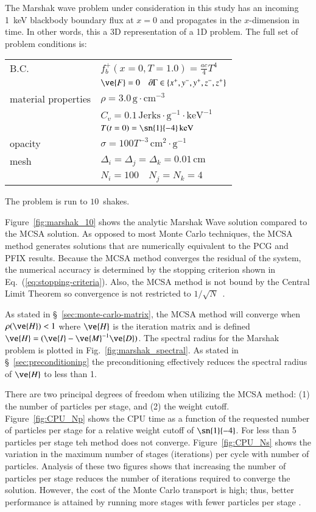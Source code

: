 \documentclass[preprint,12pt]{elsarticle}
\newcommand{\vI}{\ensuremath{\ve{I}}}
\newcommand{\Cv}{\ensuremath{C_{v}}}
\newcommand{\Di}{\ensuremath{\Delta_i}}
\newcommand{\Dj}{\ensuremath{\Delta_j}}
\newcommand{\Dk}{\ensuremath{\Delta_k}}
\begin{document}
The Marshak wave problem under consideration in this study has an
incoming 1~keV blackbody boundary flux at $x=0$ and propagates
in the $x$-dimension in time.  In other words, this a 3D
representation of a 1D problem.  The full set of problem conditions
is:
\begin{center}
  \begin{tabular}{ll}\hline
    B.C. & $f_b^{+}(x=0,T=1.0) = \frac{ac}{4}T^4$ \\
    & $\ve{F} = 0\quad \partial\Gamma \in \{x^{+}, y^{-}, y^{+},
    z^{-}, z^{+}\}$ \\
    material properties & $\rho = 3.0\,\text{g}\cdot\text{cm}^{-3}$ \\
    & $\Cv = 0.1\,\text{Jerks}\cdot\text{g}^{-1}\cdot\text{keV}^{-1}$\\
    & $T(t=0) = \sn{1}{-4}\,\text{keV}$\\
    opacity & $\sigma = 100T^{-3}\,\text{cm}^2\cdot\text{g}^{-1}$ \\
    mesh & $\Di = \Dj = \Dk = 0.01\,\text{cm}$ \\
    & $N_i = 100\quad N_j = N_k = 4$ \\
    \hline
  \end{tabular}
\end{center}
The problem is run to $10$~shakes.

Figure~\ref{fig:marshak_10} shows the analytic Marshak Wave solution
compared to the MCSA solution.  As opposed to most Monte Carlo
techniques, the MCSA method generates solutions that are numerically
equivalent to the PCG and PFIX results.  Because the MCSA method
converges the residual of the system, the numerical accuracy is
determined by the stopping criterion shown in
Eq.~(\ref{eq:stopping-criteria}).  Also, the MCSA method is not bound
by the Central Limit Theorem so convergence is not restricted to
$1/\sqrt{N}$~\cite{halton_1994,evans_2003}.

As stated in \S~\ref{sec:monte-carlo-matrix}, the MCSA method will
converge when $\rho(\ve{H})< 1$ where $\ve{H}$ is the iteration matrix
and is defined $\ve{H} = (\vI - \ve{M}^{-1}\ve{D})$.  The spectral
radius for the Marshak problem is plotted in
Fig.~\ref{fig:marshak_spectral}.  As stated in
\S~\ref{sec:preconditioning} the preconditioning effectively reduces
the spectral radius of $\ve{H}$ to less than 1.

There are two principal degrees of freedom when utilizing the MCSA
method: (1) the number of particles per stage, and (2) the weight
cutoff.  Figure~\ref{fig:CPU_Np} shows the CPU time as a function of
the requested number of particles per stage for a relative weight
cutoff of $\sn{1}{-4}$.  For less than 5 particles per stage teh
method does not converge.  Figure~\ref{fig:CPU_Ns} shows the variation
in the maximum number of stages (iterations) per cycle with number of
particles.  Analysis of these two figures shows that increasing the
number of particles per stage reduces the number of iterations
required to converge the solution.  However, the cost of the Monte
Carlo transport is high; thus, better performance is attained by
running more stages with fewer particles per stage \cite{evans_2003}.
\end{document}
